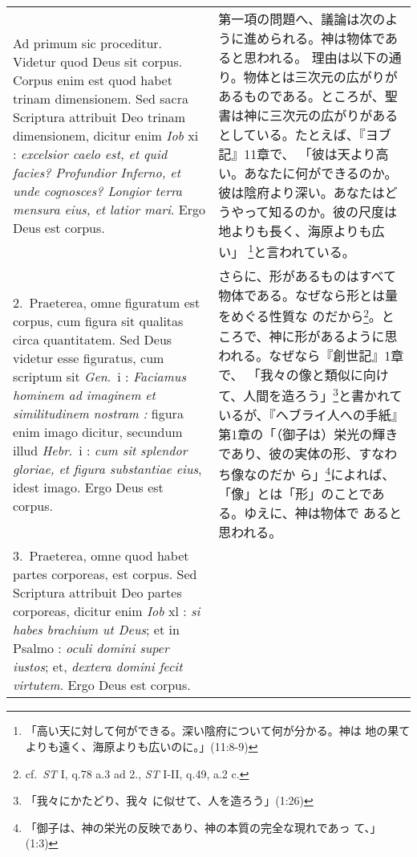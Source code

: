 \documentclass[10pt]{jsarticle}
\begin{document}
\begin{longtable}{p{21em}p{21em}}


{\huge A}{\sc d primum sic proceditur}. Videtur quod Deus sit
corpus. Corpus enim est quod habet trinam dimensionem. Sed sacra
Scriptura attribuit Deo trinam dimensionem, dicitur enim {\it Iob}
{\sc xi} : {\it excelsior caelo est, et quid facies? Profundior
Inferno, et unde cognosces? Longior terra mensura eius, et latior
mari}. Ergo Deus est corpus.

& 

第一項の問題へ、議論は次のように進められる。神は物体であると思われる。
理由は以下の通り。物体とは三次元の広がりがあるものである。ところが、聖
書は神に三次元の広がりがあるとしている。たとえば、『ヨブ記』11章で、
「彼は天より高い。あなたに何ができるのか。彼は陰府より深い。あなたはど
うやって知るのか。彼の尺度は地よりも長く、海原よりも広い」
\footnote{「高い天に対して何ができる。深い陰府について何が分かる。神は
地の果てよりも遠く、海原よりも広いのに。」(11:8-9)}と言われている。

\\


2.~{\sc Praeterea}, omne figuratum est corpus, cum figura sit qualitas
circa quantitatem. Sed Deus videtur esse figuratus, cum scriptum sit
{\it Gen}.~{\sc i} : {\it Faciamus hominem ad imaginem et
similitudinem nostram :} figura enim imago dicitur, secundum illud
{\it Hebr}.~{\sc i} : {\it cum sit splendor gloriae, et figura
substantiae eius}, idest imago. Ergo Deus est corpus.

&

さらに、形があるものはすべて物体である。なぜなら形とは量をめぐる性質な
のだから\footnote{cf.~{\it ST} I, q.78 a.3 ad 2., {\it ST} I-II, q.49,
a.2 c.}。ところで、神に形があるように思われる。なぜなら『創世記』1章で、
「我々の像と類似に向けて、人間を造ろう」\footnote{「我々にかたどり、我々
に似せて、人を造ろう」(1:26)}と書かれているが、『ヘブライ人への手紙』
第1章の「（御子は）栄光の輝きであり、彼の実体の形、すなわち像なのだか
ら」\footnote{「御子は、神の栄光の反映であり、神の本質の完全な現れであっ
て、」(1:3)}によれば、「像」とは「形」のことである。ゆえに、神は物体で
あると思われる。

\\




3.~{\sc Praeterea}, omne quod habet partes corporeas, est corpus. Sed
Scriptura attribuit Deo partes corporeas, dicitur enim {\it Iob} {\sc
xl} : {\it si habes brachium ut Deus}; et in Psalmo : {\it oculi
domini super iustos}; et, {\it dextera domini fecit virtutem}. Ergo
Deus est corpus.


\end{longtable}
\end{document}
